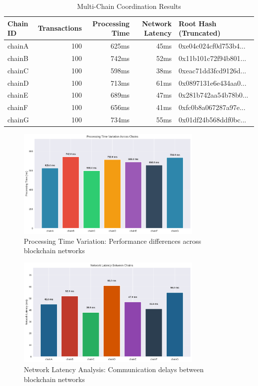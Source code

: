 \begin{table}[h]
\centering
\begin{tabular}{|l|r|r|r|l|}
\hline
\textbf{Chain ID} & \textbf{Transactions} & \textbf{Processing Time} & \textbf{Network Latency} & \textbf{Root Hash (Truncated)} \\
\hline
chainA & 100 & 625ms & 45ms & 0xe04c024cf0d753b4... \\
\hline
chainB & 100 & 742ms & 52ms & 0x11b101c72f94b801... \\
\hline
chainC & 100 & 598ms & 38ms & 0xeac71dd3fcd9126d... \\
\hline
chainD & 100 & 713ms & 61ms & 0x0897131e6e434aa0... \\
\hline
chainE & 100 & 689ms & 47ms & 0x281b742aa54b78b0... \\
\hline
chainF & 100 & 656ms & 41ms & 0xfc0b8a067287a97e... \\
\hline
chainG & 100 & 734ms & 55ms & 0x01df24b568ddf0bc... \\
\hline
\end{tabular}
\caption{Multi-Chain Coordination Results}
\label{tab:multichain-results}
\end{table}

\begin{figure}[h]
\centering
\includegraphics[width=0.8\textwidth]{Images/processing_time_analysis.png}
\caption{Processing Time Variation: Performance differences across blockchain networks}
\label{fig:processing-time-analysis}
\end{figure}

\begin{figure}[h]
\centering
\includegraphics[width=0.8\textwidth]{Images/network_latency_analysis.png}
\caption{Network Latency Analysis: Communication delays between blockchain networks}
\label{fig:network-latency-analysis}
\end{figure}

